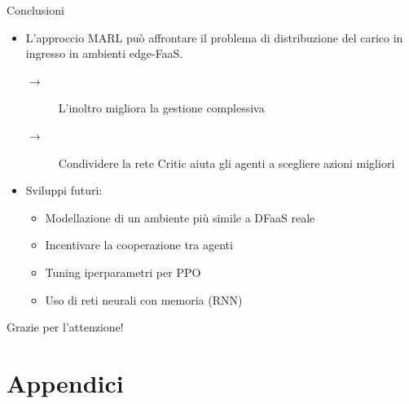 \documentclass[]{beamer}
\begin{document}
\begin{frame}{Conclusioni}
    \begin{itemize}
        \item L'approccio MARL può affrontare il problema di distribuzione del carico in ingresso in ambienti edge-FaaS.
        \begin{description}
            \item[$\rightarrow$] L'inoltro migliora la gestione complessiva
            \item[$\rightarrow$] Condividere la rete Critic aiuta gli agenti a scegliere azioni migliori
        \end{description}

        \medskip

        \item Sviluppi futuri:
        \begin{itemize}
            \item Modellazione di un ambiente più simile a DFaaS reale
            \item Incentivare la cooperazione tra agenti
            \item Tuning iperparametri per PPO
            \item Uso di reti neurali con memoria (RNN)
        \end{itemize}
    \end{itemize}
\end{frame}

{

    \begin{frame}[plain]
        \vfill
        \centering
        \color{white} \huge Grazie per l'attenzione!
        \vfill
    \end{frame}
}

\appendix
\section{Appendici}
\end{document}
